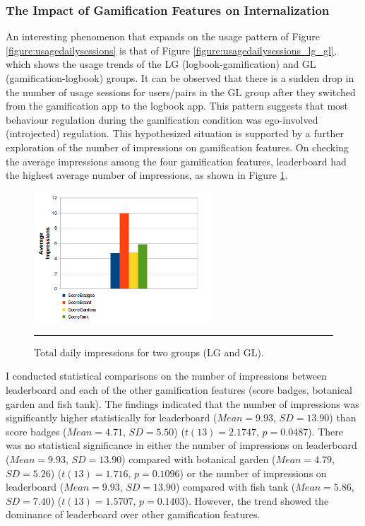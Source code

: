 \subsubsection{The Impact of Gamification Features on Internalization}\label{dim2}
An interesting phenomenon that expands on the usage pattern of Figure \ref{figure:usagedailysessions} is that of Figure \ref{figure:usagedailysessions_lg_gl}, which shows the usage trends of the LG (logbook-gamification) and GL (gamification-logbook) groups. It can be observed that there is a sudden drop in the number of usage sessions for users/pairs in the GL group after they switched from the gamification app to the logbook app. This pattern suggests that most behaviour regulation during the gamification condition was ego-involved (introjected) regulation. This hypothesized situation is supported by a further exploration of the number of impressions on gamification features. On checking the average impressions among the four gamification features, leaderboard had the highest average number of impressions, as shown in Figure \ref{figure:gamification_impressions_latest_all}. 
\begin{figure}[htbp]
  \centering
    \includegraphics[width=0.6\textwidth]{Figures/gamification_impressions_latest_all.png}
    \rule{35em}{0.5pt}
  \caption{Total daily impressions for two groups (LG and GL).}
  \label{figure:gamification_impressions_latest_all}
\end{figure}
I conducted statistical comparisons on the number of impressions between leaderboard and each of the other gamification features (score badges, botanical garden and fish tank). The findings indicated that the number of impressions was significantly higher statistically for leaderboard ($Mean=9.93$, $SD=13.90$) than score badges ($Mean=4.71$, $SD = 5.50$) ($t (13) =2.1747$, $p=0.0487$). There was no statistical significance in either the number of impressions on leaderboard ($Mean=9.93$, $SD=13.90$) compared with botanical garden ($Mean = 4.79$, $SD = 5.26$) ($t(13)=1.716$, $p= 0.1096$) or the number of impressions on leaderboard ($Mean= 9.93$, $SD = 13.90$) compared with fish tank ($Mean=5.86$, $SD=7.40$) ($t(13)=1.5707$, $p = 0.1403$). However, the trend showed the dominance of leaderboard over other gamification features. 

